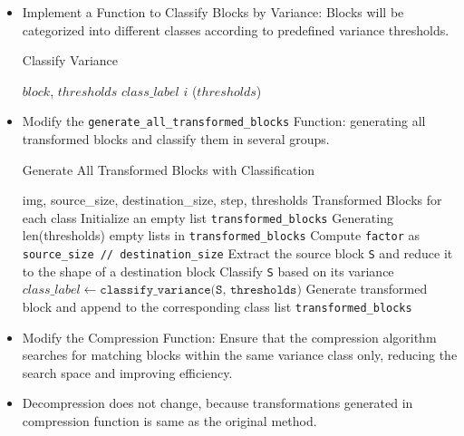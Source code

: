 \documentclass[a4paper,11pt, titlepage]{article}
\theoremstyle{definition}
\theoremstyle{plain}
\theoremstyle{remark}
\theoremstyle{definition}
\begin{document}
\begin{itemize}
    \item Implement a Function to Classify Blocks by Variance: Blocks will be categorized into different classes according to predefined variance thresholds.

\begin{algorithm}
\caption{Classify Variance}
\begin{algorithmic}[1]
    \REQUIRE  $block$, $thresholds$
    \ENSURE $class\_label$
            \RETURN $i$
        \ENDIF
    \ENDFOR
    \RETURN {}($thresholds$)
\end{algorithmic}
\end{algorithm}
    \item Modify the \texttt{generate\_all\_transformed\_blocks} Function: generating all transformed blocks and classify them in several groups. 

\begin{algorithm}
\caption{Generate All Transformed Blocks with Classification}
\begin{algorithmic}[1]
\REQUIRE img, source\_size, destination\_size, step, thresholds
\ENSURE Transformed Blocks for each class
\STATE Initialize an empty list \texttt{transformed\_blocks}
\STATE Generating len(thresholds) empty lists in \texttt{transformed\_blocks}
\STATE Compute \texttt{factor} as \texttt{source\_size // destination\_size}
    \STATE Extract the source block \texttt{S} and reduce it to the shape of a destination block
    \STATE Classify \texttt{S} based on its variance
    \STATE $class\_label \leftarrow \texttt{classify\_variance(S, thresholds)}$
        \STATE Generate transformed block and append to the corresponding class list
    \ENDFOR
\ENDFOR
\RETURN \texttt{transformed\_blocks}
\end{algorithmic}
\end{algorithm}

    \item Modify the Compression Function: Ensure that the compression algorithm searches for matching blocks within the same variance class only, reducing the search space and improving efficiency.

    \item Decompression does not change, because transformations generated in compression function is same as the original method.
\end{itemize}
\end{document}
